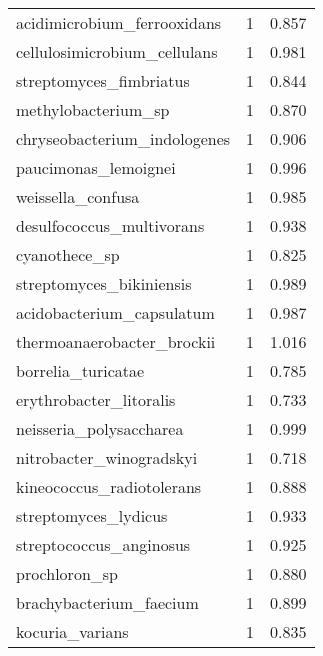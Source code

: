 \begin{tabular}{lrr}
                 acidimicrobium\_ferrooxidans &                   1 &     0.857 \\
                cellulosimicrobium\_cellulans &                   1 &     0.981 \\
                     streptomyces\_fimbriatus &                   1 &     0.844 \\
                         methylobacterium\_sp &                   1 &     0.870 \\
                chryseobacterium\_indologenes &                   1 &     0.906 \\
                        paucimonas\_lemoignei &                   1 &     0.996 \\
                           weissella\_confusa &                   1 &     0.985 \\
                   desulfococcus\_multivorans &                   1 &     0.938 \\
                               cyanothece\_sp &                   1 &     0.825 \\
                    streptomyces\_bikiniensis &                   1 &     0.989 \\
                   acidobacterium\_capsulatum &                   1 &     0.987 \\
                  thermoanaerobacter\_brockii &                   1 &     1.016 \\
                          borrelia\_turicatae &                   1 &     0.785 \\
                     erythrobacter\_litoralis &                   1 &     0.733 \\
                     neisseria\_polysaccharea &                   1 &     0.999 \\
                    nitrobacter\_winogradskyi &                   1 &     0.718 \\
                   kineococcus\_radiotolerans &                   1 &     0.888 \\
                        streptomyces\_lydicus &                   1 &     0.933 \\
                     streptococcus\_anginosus &                   1 &     0.925 \\
                               prochloron\_sp &                   1 &     0.880 \\
                     brachybacterium\_faecium &                   1 &     0.899 \\
                             kocuria\_varians &                   1 &     0.835 \\

\end{tabular}

